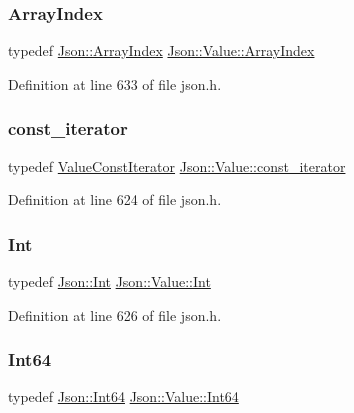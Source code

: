 \subsubsection{\texorpdfstring{Array\+Index}{ArrayIndex}}
{\footnotesize\ttfamily typedef \hyperlink{namespace_json_a8048e741f2177c3b5d9ede4a5b8c53c2}{Json\+::\+Array\+Index} \hyperlink{class_json_1_1_value_a184a91566cccca7b819240f0d5561c7d}{Json\+::\+Value\+::\+Array\+Index}}



Definition at line 633 of file json.\+h.

\mbox{\label{class_json_1_1_value_af92282ca92b58b320debd486afb7696a}} 
\subsubsection{\texorpdfstring{const\+\_\+iterator}{const\_iterator}}
{\footnotesize\ttfamily typedef \hyperlink{class_json_1_1_value_const_iterator}{Value\+Const\+Iterator} \hyperlink{class_json_1_1_value_af92282ca92b58b320debd486afb7696a}{Json\+::\+Value\+::const\+\_\+iterator}}



Definition at line 624 of file json.\+h.

\mbox{\label{class_json_1_1_value_abdf7a7ff73eb130ffcab28504ffdb405}} 
\subsubsection{\texorpdfstring{Int}{Int}}
{\footnotesize\ttfamily typedef \hyperlink{namespace_json_a08122e8005b706d982e48cca1e2119c7}{Json\+::\+Int} \hyperlink{class_json_1_1_value_abdf7a7ff73eb130ffcab28504ffdb405}{Json\+::\+Value\+::\+Int}}



Definition at line 626 of file json.\+h.

\mbox{\label{class_json_1_1_value_a1b86af9f85f0f1baa972c3319fa22695}} 
\subsubsection{\texorpdfstring{Int64}{Int64}}
{\footnotesize\ttfamily typedef \hyperlink{namespace_json_ac62566f36fd33115957b91305c9ed1dc}{Json\+::\+Int64} \hyperlink{class_json_1_1_value_a1b86af9f85f0f1baa972c3319fa22695}{Json\+::\+Value\+::\+Int64}}



